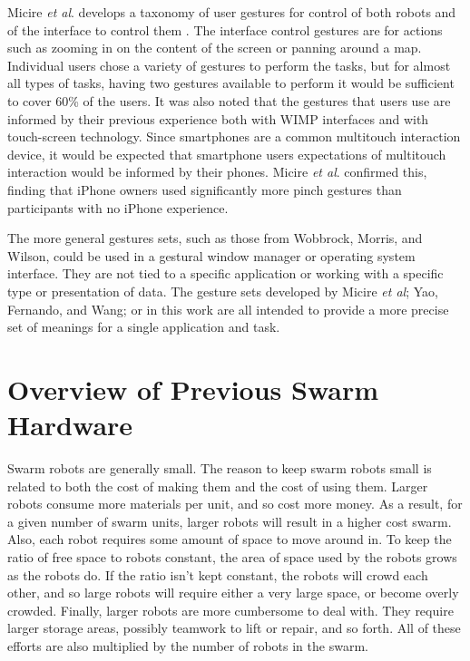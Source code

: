 Micire \textit{et al}. develops a taxonomy of user gestures for control of both robots and of the interface to control them \citep{Micire:2009:ANG:1731903.1731912}. 
The interface control gestures are for actions such as zooming in on the content of the screen or panning around a map. 
Individual users chose a variety of gestures to perform the tasks, but for almost all types of tasks, having two gestures available to perform it would be sufficient to cover 60\% of the users. 
It was also noted that the gestures that users use are informed by their previous experience both with WIMP interfaces and with touch-screen technology. 
Since smartphones are a common multitouch interaction device, it would be expected that smartphone users expectations of multitouch interaction would be informed by their phones. 
Micire \textit{et al}. confirmed this, finding that iPhone owners used significantly more pinch gestures than participants with no iPhone experience. 
 
The more general gestures sets, such as those from Wobbrock, Morris, and Wilson, could be used in a gestural window manager or operating system interface. 
They are not tied to a specific application or working with a specific type or presentation of data.
The gesture sets developed by Micire \textit{et al}; Yao, Fernando, and Wang; or in this work are all intended to provide a more precise set of meanings for a single application and task. 

\section{Overview of Previous Swarm Hardware}

Swarm robots are generally small. 
The reason to keep swarm robots small is related to both the cost of making them and the cost of using them. 
Larger robots consume more materials per unit, and so cost more money.
As a result, for a given number of swarm units, larger robots will result in a higher cost swarm. 
Also, each robot requires some amount of space to move around in. 
To keep the ratio of free space to robots constant, the area of space used by the robots grows as the robots do. 
If the ratio isn't kept constant, the robots will crowd each other, and so large robots will require either a very large space, or become overly crowded.
Finally, larger robots are more cumbersome to deal with. 
They require larger storage areas, possibly teamwork to lift or repair, and so forth. 
All of these efforts are also multiplied by the number of robots in the swarm. 

